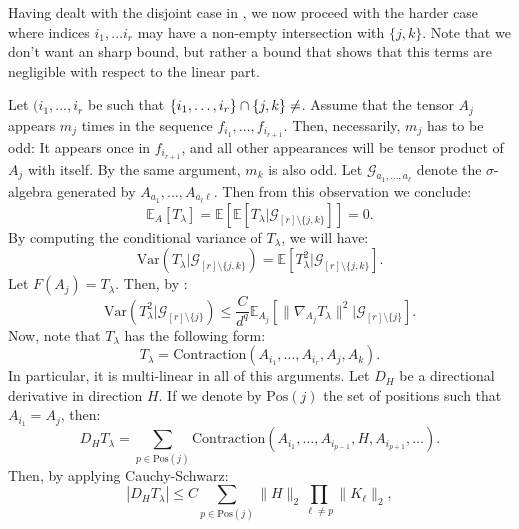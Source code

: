 \documentclass[]{article}
\numberwithin{equation}{section}
\theoremstyle{definition}
\newcommand{\EE}{\mathbb{E}}
\begin{document}
Having dealt with the disjoint case in , we now proceed with the harder case where indices $i_{1}, \dots i_{r}$ may have a non-empty intersection with $\{j,k\}$. Note that we don't want an sharp bound, but rather a bound that shows that this terms are negligible with respect to the linear part. 

Let $(i_{1},\dots, i_{r}$ be such that $\{ i_{1},\dots, i_{r}\} \cap \{j,k\} \not = \empty$. Assume that the tensor $A_{j}$ appears $m_{j}$ times in the sequence $f_{i_1}, \dots, f_{i_{r+1}}$. Then, necessarily, $m_{j}$ has to be odd: It appears once in $f_{i_{r+1}}$, and all other appearances will be tensor product of $A_j$ with itself. By the same argument, $m_{k}$ is also odd. Let $\mathcal{G}_{a_1, \dots, a_\ell}$  denote the $\sigma$-algebra generated by  $A_{a_1}, \dots, A_{a_l\ell}$. Then from this observation we conclude: 
\begin{equation}
    \EE_{A}[T_{\lambda }] = \EE [ \EE [T_\lambda | \mathcal{G}_{[r]\setminus \{j,k\}}]]= 0. 
\end{equation}
By computing the conditional variance of $T_\lambda$, we will have: 
\begin{equation}
    \mathrm{Var}(T_\lambda | \mathcal{G}_{[r]\setminus \{j,k\}}) = \EE \left [ T_\lambda^{2} | \mathcal{G}_{[r]\setminus \{j,k\}} \right ]. 
\end{equation}
Let $F(A_{j}) = T_\lambda$. Then, by :
\begin{equation}
    \mathrm{Var}(T_\lambda^{2} |\mathcal{G}_{[r]\setminus\{j\}}) \leq \dfrac{C}{d^{q}} \EE_{A_j} \left[ \| \nabla_{A_{j}} T_{\lambda}\|^{2}|\mathcal{G}_{[r]\setminus\{j\}}\right ].
\end{equation}
Now, note that $T_{\lambda}$ has the following form:
\begin{equation}
    T_{\lambda} = \mathrm{Contraction}(A_{i_1}, \dots, A_{i_r}, A_j, A_k).
\end{equation}
In particular, it is multi-linear in all of this arguments. Let $D_{H}$ be a directional derivative in direction $H$. If we denote by $\mathrm{Pos}(j)$  the set of positions such that $A_{i_1} = A_{j}$, then: 
\begin{equation}
    D_{H} T_{\lambda} = \sum_{p \in \mathrm{Pos}(j)} \mathrm{Contraction}(A_{i_1}, \dots, A_{i_{p-1}}, H, A_{i_{p+1}}, \dots).
\end{equation}
Then, by applying Cauchy-Schwarz: 
\begin{equation}
    \left | D_{H} T_{\lambda } \right | \leq C \sum_{p \in \mathrm{Pos}(j)} \|H\|_2 \prod_{\ell \not = p} \| K_{\ell}\|_2,
\end{equation}
\end{document}
